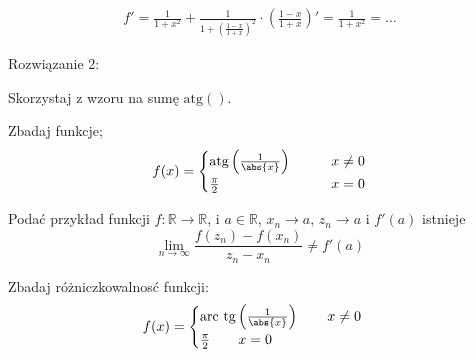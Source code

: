 \documentclass[11pt]{scrartcl}
\begin{document}
    \begin{gather*}
      f' = \frac{1}{1 + x^2} + \frac{1}{1 + \left ( \frac{1-x}{1 + x} \right )^2} \cdot \left ( \frac{1-x}{1+x} \right )' = \frac{1}{1 + x^2} = \dots
    \end{gather*}
    
    Rozwiązanie 2:
    
    Skorzystaj z wzoru na sumę $\text{atg} \left (  \right ) $.

    \begin{zaddom}
        Zbadaj funkcje;
        \[
            f(x) =
            \begin{cases}
              \text{atg} \left ( \frac{1}{\abs{x} } \right ) \qquad &x \not = 0 \\
              \frac{\pi }{2} \qquad &x = 0
            \end{cases}
        \]
    \end{zaddom}

    \begin{zaddom}
        Podać przykład funkcji $f: \mathbb{R}  \to \mathbb{R} $, i $a \in \mathbb{R} $, $x_n \to a$, $z_n \to a$ i $f'(a)$ istnieje
        \[
            \lim_{n \to \infty } \frac{f(z_n) - f(x_n)}{z_n - x_n} \not = f'(a)  
        \]
    \end{zaddom}

    \begin{zadanie}
      Zbadaj różniczkowalnosć funkcji:
      \[
          f(x) = 
          \begin{cases}
              \text{arc tg} \left ( \frac{1}{\abs{x} } \right ) \qquad x \not = 0 \\
              \frac{\pi }{2} \qquad x = 0
          \end{cases}
      \]
  \end{zadanie}
      
\end{document}
